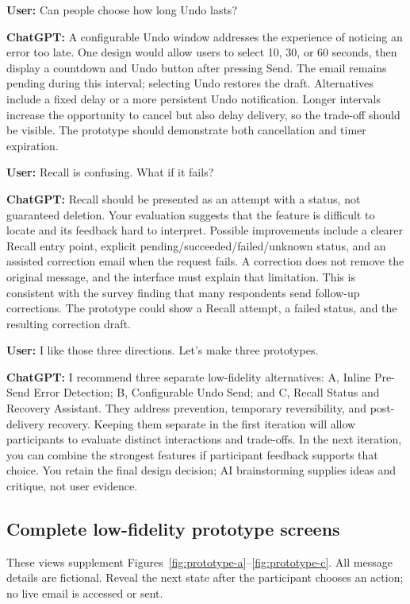 \documentclass[letterpaper]{jdf}
\begin{document}
\textbf{User:} Can people choose how long Undo lasts?

\textbf{ChatGPT:} A configurable Undo window addresses the experience of noticing an error too late. One design would allow users to select 10, 30, or 60 seconds, then display a countdown and Undo button after pressing Send. The email remains pending during this interval; selecting Undo restores the draft. Alternatives include a fixed delay or a more persistent Undo notification. Longer intervals increase the opportunity to cancel but also delay delivery, so the trade-off should be visible. The prototype should demonstrate both cancellation and timer expiration.

\textbf{User:} Recall is confusing. What if it fails?

\textbf{ChatGPT:} Recall should be presented as an attempt with a status, not guaranteed deletion. Your evaluation suggests that the feature is difficult to locate and its feedback hard to interpret. Possible improvements include a clearer Recall entry point, explicit pending/succeeded/failed/unknown status, and an assisted correction email when the request fails. A correction does not remove the original message, and the interface must explain that limitation. This is consistent with the survey finding that many respondents send follow-up corrections. The prototype could show a Recall attempt, a failed status, and the resulting correction draft.

\textbf{User:} I like those three directions. Let's make three prototypes.

\textbf{ChatGPT:} I recommend three separate low-fidelity alternatives: A, Inline Pre-Send Error Detection; B, Configurable Undo Send; and C, Recall Status and Recovery Assistant. They address prevention, temporary reversibility, and post-delivery recovery. Keeping them separate in the first iteration will allow participants to evaluate distinct interactions and trade-offs. In the next iteration, you can combine the strongest features if participant feedback supports that choice. You retain the final design decision; AI brainstorming supplies ideas and critique, not user evidence.



\subsection{Complete low-fidelity prototype screens}
\label{app:lowfi}
These views supplement Figures~\ref{fig:prototype-a}--\ref{fig:prototype-c}. All message details are fictional. Reveal the next state after the participant chooses an action; no live email is accessed or sent.
\end{document}
